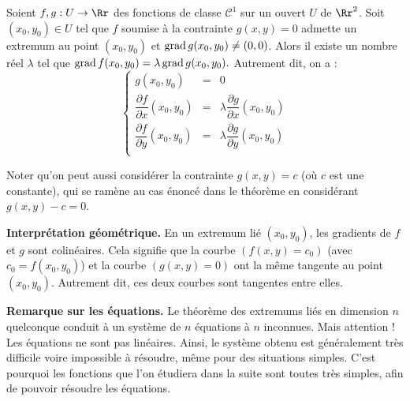 \documentclass[11pt, class=report,crop=false]{standalone}
\begin{document}


\begin{theoreme}
Soient $f,g: U \to \Rr$ des fonctions de classe $\mathcal{C}^1$ sur un ouvert $U$ de $\Rr^2$.
Soit $(x_0,y_0) \in U$ tel que $f$ soumise à la contrainte $g(x,y)=0$ admette un extremum au point $(x_0,y_0)$
et $\operatorname{grad} g(x_0,y_0) \neq (0,0)$.
Alors il existe un nombre réel $\lambda$ tel que 
$\operatorname{grad} f(x_0,y_0) = \lambda \operatorname{grad} g(x_0,y_0).$
Autrement dit, on a :
$$
\left\{
\begin{array}{rcl}
g(x_0,y_0) & = & 0 \\[1ex]
\dfrac{\partial f}{\partial x}(x_0,y_0) &=& \lambda \dfrac{\partial g}{\partial x}(x_0,y_0) \\[1ex]
\dfrac{\partial f}{\partial y}(x_0,y_0) &=& \lambda \dfrac{\partial g}{\partial y}(x_0,y_0) \\ 
\end{array}\right.
$$
\end{theoreme}

Noter qu'on peut aussi considérer la contrainte $g(x,y)=c$ (où $c$ est une constante), qui se ramène au cas énoncé dans le théorème en considérant $g(x,y)-c=0$.

\textbf{Interprétation géométrique.}
En un extremum lié $(x_0,y_0)$, les gradients de $f$ et $g$ sont colinéaires. Cela signifie que la courbe $(f(x,y) = c_0)$ (avec $c_0 = f(x_0,y_0)$) et la courbe $(g(x,y)=0)$ ont la même tangente au point $(x_0,y_0)$. Autrement dit, ces deux courbes sont tangentes entre elles.



\textbf{Remarque sur les équations.} Le théorème des extremums liés en dimension $n$ quelconque conduit à un système de $n$ équations à $n$ inconnues. Mais attention ! Les équations ne sont pas linéaires. Ainsi, le système obtenu est généralement très difficile voire impossible à résoudre, même pour des situations simples. C'est pourquoi les fonctions que l'on étudiera dans la suite sont toutes très simples, afin de pouvoir résoudre les équations.
\end{document}
